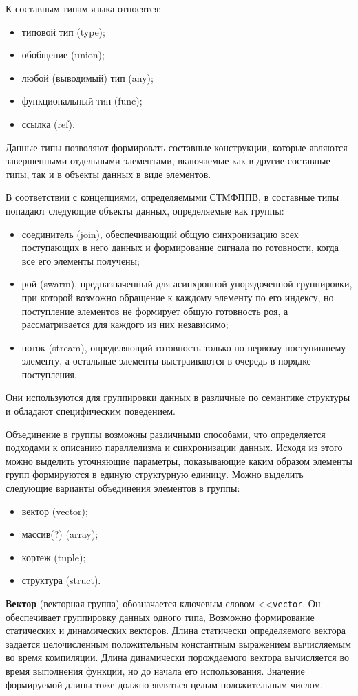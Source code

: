 {К составным типам языка относятся:
\begin{itemize}
    \item типовой тип (type);
    \item обобщение (union);
    \item любой (выводимый) тип (any);
    \item функциональный тип (func);
    \item ссылка (ref).
\end{itemize}
Данные типы позволяют формировать составные конструкции, которые являются завершенными отдельными элементами, включаемые как в другие составные типы, так и в объекты данных в виде элементов.

В соответствии с концепциями, определяемыми СТМФППВ, в составные типы попадают следующие объекты данных, определяемые как группы:
\begin{itemize}
    \item соединитель (join), обеспечивающий общую синхронизацию всех поступающих в него данных и формирование сигнала по готовности, когда все его элементы получены;
    \item рой (swarm), предназначенный для асинхронной упорядоченной группировки, при которой возможно обращение к каждому элементу по его индексу, но поступление элементов не формирует общую готовность роя, а рассматривается для каждого из них независимо;
    \item поток (stream), определяющий готовность только по первому поступившему элементу, а остальные элементы выстраиваются в очередь в порядке поступления.
\end{itemize}
Они используются для группировки данных в различные по семантике структуры и обладают специфическим поведением.

Объединение в группы возможны различными способами, что определяется подходами к описанию параллелизма и синхронизации данных. Исходя из этого можно выделить уточняющие параметры, показывающие каким образом элементы групп формируются в единую структурную единицу. Можно выделить следующие варианты объединения элементов в группы:
\begin{itemize}
	\item вектор (vector);
	\item массив(?) (array);
	\item кортеж (tuple);
	\item структура (struct).
\end{itemize}

\textbf{Вектор} (векторная группа) обозначается ключевым словом <<\verb|vector|. Он обеспечивает группировку данных одного типа, Возможно формирование статических и динамических векторов. Длина статически определяемого вектора задается целочисленным положительным константным выражением вычисляемым во время компиляции. Длина динамически порождаемого вектора вычисляется во время выполнения функции, но до начала его использования. Значение формируемой длины тоже должно являться целым положительным числом.

}
